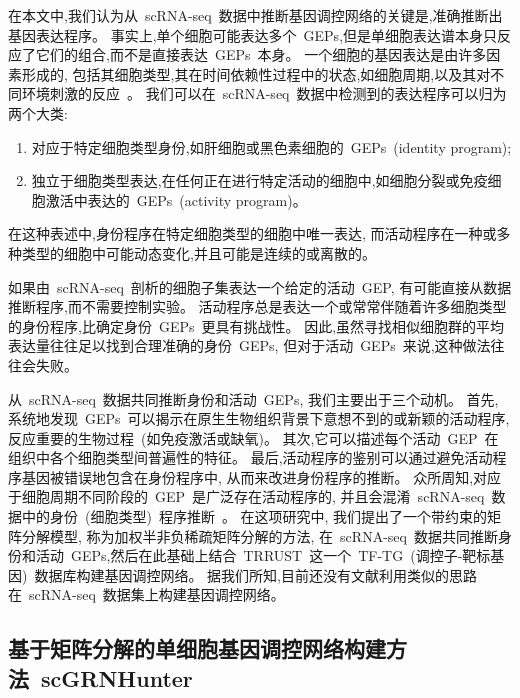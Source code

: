 在本文中,我们认为从~scRNA-seq~数据中推断基因调控网络的关键是,准确推断出基因表达程序。
事实上,单个细胞可能表达多个~GEPs,但是单细胞表达谱本身只反应了它们的组合,而不是直接表达~GEPs~本身。
一个细胞的基因表达是由许多因素形成的,
包括其细胞类型,其在时间依赖性过程中的状态,如细胞周期,以及其对不同环境刺激的反应~\cite{wagner2016revealing}。
我们可以在~scRNA-seq~数据中检测到的表达程序可以归为两个大类:
\begin{enumerate}
    \item 对应于特定细胞类型身份,如肝细胞或黑色素细胞的~GEPs~(identity program);
    \item 独立于细胞类型表达,在任何正在进行特定活动的细胞中,如细胞分裂或免疫细胞激活中表达的~GEPs~(activity program)。
\end{enumerate}
在这种表述中,身份程序在特定细胞类型的细胞中唯一表达,
而活动程序在一种或多种类型的细胞中可能动态变化,并且可能是连续的或离散的。

如果由~scRNA-seq~剖析的细胞子集表达一个给定的活动~GEP,
有可能直接从数据推断程序,而不需要控制实验。
活动程序总是表达一个或常常伴随着许多细胞类型的身份程序,比确定身份~GEPs~更具有挑战性。
因此,虽然寻找相似细胞群的平均表达量往往足以找到合理准确的身份~GEPs,
但对于活动~GEPs~来说,这种做法往往会失败。

从~scRNA-seq~数据共同推断身份和活动~GEPs, 我们主要出于三个动机。
首先,系统地发现~GEPs~可以揭示在原生生物组织背景下意想不到的或新颖的活动程序,
反应重要的生物过程~(如免疫激活或缺氧)。
其次,它可以描述每个活动~GEP~在组织中各个细胞类型间普遍性的特征。
最后,活动程序的鉴别可以通过避免活动程序基因被错误地包含在身份程序中, 从而来改进身份程序的推断。
众所周知,对应于细胞周期不同阶段的~GEP~是广泛存在活动程序的,
并且会混淆~scRNA-seq~数据中的身份~(细胞类型)~程序推断~\cite{scialdone2015computational,chen2017controlling}。
在这项研究中, 我们提出了一个带约束的矩阵分解模型, 称为加权半非负稀疏矩阵分解的方法,
在~scRNA-seq~数据共同推断身份和活动~GEPs,然后在此基础上结合~TRRUST~这一个~TF-TG~(调控子-靶标基因)~数据库构建基因调控网络。
据我们所知,目前还没有文献利用类似的思路在~scRNA-seq~数据集上构建基因调控网络。

\subsection{基于矩阵分解的单细胞基因调控网络构建方法~scGRNHunter}

